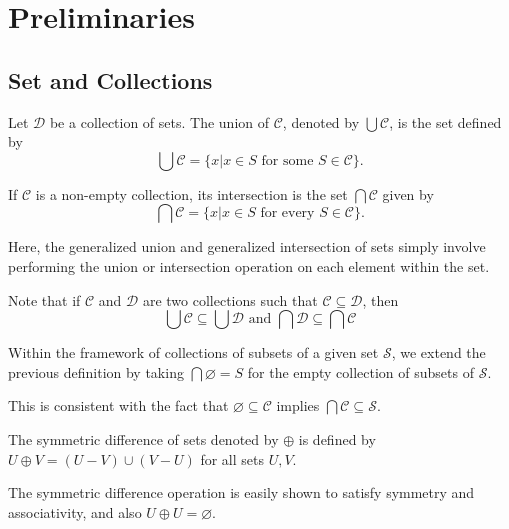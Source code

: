 \documentclass[../main.tex]{subfiles}
\begin{document}
\section{Preliminaries}
\subsection{Set and Collections}
\begin{purple}
\begin{definition}
    Let $\mathcal{D}$ be a collection of sets. The union of $\mathcal{C}$, denoted by $\bigcup \mathcal{C}$, is the set defined by
    $$
    \bigcup\mathcal{C}=\{x|x\in S \text{ for some } S\in \mathcal{C}\}.
    $$

    If $\mathcal{C}$ is a non-empty collection, its intersection is the set $\bigcap\mathcal{C}$ given by 
    $$
    \bigcap\mathcal{C} = \{x|x\in S \text{ for every } S \in \mathcal{C}\}.
    $$
\end{definition}
\end{purple}

\begin{green}
Here, the generalized union and generalized intersection of sets simply involve performing the union or intersection operation on each element within the set.
\end{green}

Note that if $\mathcal{C}$ and $\mathcal{D}$ are two collections such that $\mathcal{C}\subseteq\mathcal{D}$, then
$$
\bigcup \mathcal{C}\subseteq \bigcup\mathcal{D} \text{ and }
\bigcap \mathcal{D} \subseteq \bigcap \mathcal{C}
$$

Within the framework of collections of subsets of a given set $\mathcal{S}$, we extend the previous definition by taking $\bigcap \varnothing = S$ for the empty collection of subsets of $\mathcal{S}$.

\begin{green}
    This is consistent with the fact that $\varnothing \subseteq \mathcal{C}$ implies $\bigcap \mathcal{C} \subseteq \mathcal{S}$. 
\end{green}

\begin{purple}
\begin{definition}
    The symmetric difference of sets denoted by $\oplus$ is defined by $U \oplus V = (U - V) \cup (V - U)$ for all sets $U, V$.
\end{definition}
\end{purple}

The symmetric difference operation is easily shown to satisfy symmetry and associativity, and also $U\oplus U=\varnothing$.
\end{document}
